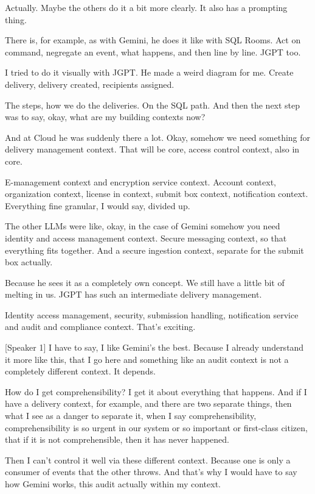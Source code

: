 Actually. Maybe the others do it a bit more clearly. It also has a prompting thing.

There is, for example, as with Gemini, he does it like with SQL Rooms. Act on command, negregate an event, what happens, and then line by line. JGPT too.

I tried to do it visually with JGPT. He made a weird diagram for me. Create delivery, delivery created, recipients assigned.

The steps, how we do the deliveries. On the SQL path. And then the next step was to say, okay, what are my building contexts now?

And at Cloud he was suddenly there a lot. Okay, somehow we need something for delivery management context. That will be core, access control context, also in core.

E-management context and encryption service context. Account context, organization context, license in context, submit box context, notification context. Everything fine granular, I would say, divided up.

The other LLMs were like, okay, in the case of Gemini somehow you need identity and access management context. Secure messaging context, so that everything fits together. And a secure ingestion context, separate for the submit box actually.

Because he sees it as a completely own concept. We still have a little bit of melting in us. JGPT has such an intermediate delivery management.

Identity access management, security, submission handling, notification service and audit and compliance context. That's exciting.

[Speaker 1]
I have to say, I like Gemini's the best. Because I already understand it more like this, that I go here and something like an audit context is not a completely different context. It depends.

How do I get comprehensibility? I get it about everything that happens. And if I have a delivery context, for example, and there are two separate things, then what I see as a danger to separate it, when I say comprehensibility, comprehensibility is so urgent in our system or so important or first-class citizen, that if it is not comprehensible, then it has never happened.

Then I can't control it well via these different context. Because one is only a consumer of events that the other throws. And that's why I would have to say how Gemini works, this audit actually within my context.

